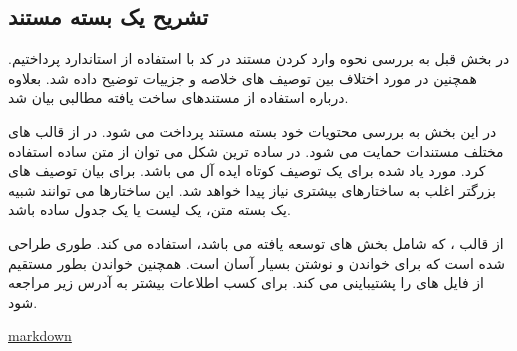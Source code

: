 \subsection{تشریح یک بسته مستند}

در بخش قبل به بررسی نحوه وارد کردن مستند در کد با استفاده از استاندارد
 پرداختیم. همچنین در مورد اختلاف بین توصیف های خلاصه و جزییات  توضیح
داده شد. بعلاوه درباره استفاده از مستندهای ساخت یافته مطالبی بیان شد.

در این بخش به بررسی محتویات خود بسته مستند پرداخت می شود.
در  از قالب های مختلف مستندات حمایت می شود.
در ساده ترین شکل می توان از متن ساده استفاده کرد. مورد یاد شده برای یک توصیف
کوتاه ایده آل می باشد.
برای بیان توصیف های بزرگتر اغلب به ساختارهای بیشتری نیاز پیدا خواهد شد. این
ساختارها می توانند شبیه یک بسته متن، یک لیست یا یک جدول ساده باشد.

 از قالب  ، که شامل بخش های توسعه یافته  می باشد، استفاده می کند.
 طوری طراحی شده است که برای خواندن و نوشتن بسیار آسان است.
 همچنین خواندن بطور مستقیم از فایل های  را پشتیباینی می
کند.
برای کسب اطلاعات بیشتر به آدرس زیر مراجعه شود.

\href{http://www.stack.nl/~dimitri/doxygen/markdown.html}{markdown}

